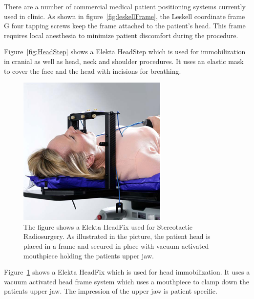 There are a number of commercial medical patient positioning systems currently
used in clinic. As shown in figure~\ref{fig:leskellFrame}, the Leskell coordinate frame G four tapping screws
keep the frame attached to the patient's head. This frame requires local 
anesthesia to minimize patient discomfort during the procedure. 



Figure~\ref{fig:HeadStep} shows a Elekta HeadStep which is used for
immobilization in cranial as well as head, neck and shoulder procedures.
It uses an elastic mask to cover the face and the head with incisions for 
breathing. 


\begin{figure}[t!]
  \begin{center}
    \includegraphics[width=0.9\linewidth]{images/headfix}
  \end{center}
  \vspace{-10pt}
\caption{ The figure shows a Elekta HeadFix used for Stereotactic Radiosurgery.
As illustrated in the picture, the patient head is placed in a frame and secured in place with vacuum activated mouthpiece holding the patients upper jaw.}
  \vspace*{-15pt}
  \label{fig:HeadFix}
\end{figure}


Figure~\ref{fig:HeadFix} shows a Elekta HeadFix which is used for
head immobilization. It uses a vacuum activated head frame system which uses a 
mouthpiece to clamp down the patients upper jaw. The impression of the upper jaw 
is patient specific. 

